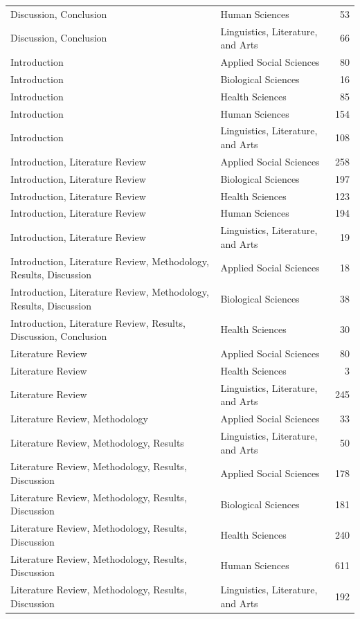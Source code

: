 \begin{longtable}{llr}
Discussion, Conclusion & Human Sciences & 53 \\
Discussion, Conclusion & Linguistics, Literature, and Arts & 66 \\
Introduction & Applied Social Sciences & 80 \\
Introduction & Biological Sciences & 16 \\
Introduction & Health Sciences & 85 \\
Introduction & Human Sciences & 154 \\
Introduction & Linguistics, Literature, and Arts & 108 \\
Introduction, Literature Review & Applied Social Sciences & 258 \\
Introduction, Literature Review & Biological Sciences & 197 \\
Introduction, Literature Review & Health Sciences & 123 \\
Introduction, Literature Review & Human Sciences & 194 \\
Introduction, Literature Review & Linguistics, Literature, and Arts & 19 \\
Introduction, Literature Review, Methodology, Results, Discussion & Applied Social Sciences & 18 \\
Introduction, Literature Review, Methodology, Results, Discussion & Biological Sciences & 38 \\
Introduction, Literature Review, Results, Discussion, Conclusion & Health Sciences & 30 \\
Literature Review & Applied Social Sciences & 80 \\
Literature Review & Health Sciences & 3 \\
Literature Review & Linguistics, Literature, and Arts & 245 \\
Literature Review, Methodology & Applied Social Sciences & 33 \\
Literature Review, Methodology, Results & Linguistics, Literature, and Arts & 50 \\
Literature Review, Methodology, Results, Discussion & Applied Social Sciences & 178 \\
Literature Review, Methodology, Results, Discussion & Biological Sciences & 181 \\
Literature Review, Methodology, Results, Discussion & Health Sciences & 240 \\
Literature Review, Methodology, Results, Discussion & Human Sciences & 611 \\
Literature Review, Methodology, Results, Discussion & Linguistics, Literature, and Arts & 192 \\

\end{longtable}
